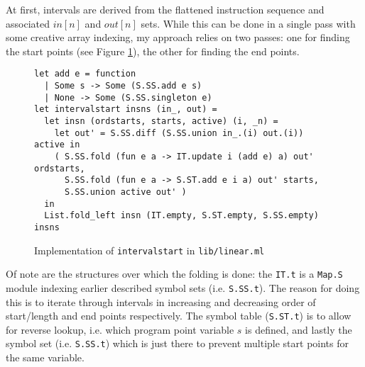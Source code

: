 \documentclass{article}
\begin{document}
At first, intervals are derived from the flattened instruction sequence and associated \(\mathit{in}[n]\) and \(\mathit{out}[n]\) sets. 
While this can be done in a single pass with some creative array indexing, my approach relies on two passes: one for finding the start points (see Figure \ref{fig:livenessstarts.ml}), the other for finding the end points.

\begin{figure}[H]
  \centering
   \begin{minipage}[b]{0.88\textwidth}
     \centering
     \begin{verbatim}
let add e = function
  | Some s -> Some (S.SS.add e s)
  | None -> Some (S.SS.singleton e)
let intervalstart insns (in_, out) =
  let insn (ordstarts, starts, active) (i, _n) =
    let out' = S.SS.diff (S.SS.union in_.(i) out.(i)) active in
    ( S.SS.fold (fun e a -> IT.update i (add e) a) out' ordstarts,
      S.SS.fold (fun e a -> S.ST.add e i a) out' starts,
      S.SS.union active out' )
  in
  List.fold_left insn (IT.empty, S.ST.empty, S.SS.empty) insns
     \end{verbatim}
     \caption{Implementation of \texttt{intervalstart} in \texttt{lib/linear.ml}}\label{fig:livenessstarts.ml}
   \end{minipage}
\end{figure}

\noindent Of note are the structures over which the folding is done: the \texttt{IT.t} is a \texttt{Map.S} module indexing earlier described symbol sets (i.e. \texttt{S.SS.t}). The reason for doing this is to iterate through intervals in increasing and decreasing order of start/length and end points respectively. The symbol table (\texttt{S.ST.t}) is to allow for reverse lookup, i.e. which program point variable \(s\) is defined, and lastly the symbol set (i.e. \texttt{S.SS.t}) which is just there to prevent multiple start points for the same variable.
\end{document}
